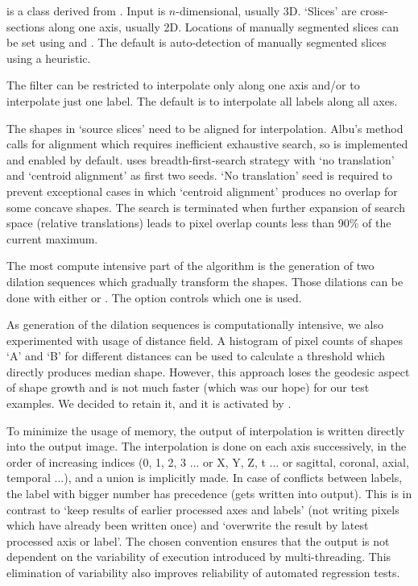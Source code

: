\documentclass{InsightArticle}
\begin{document}
 is a class derived from
.
Input is $n$-dimensional, usually 3D.
`Slices' are cross-sections along one axis, usually 2D.
Locations of manually segmented slices can be set using
 and .
The default is auto-detection of manually segmented slices using a heuristic.

The filter can be restricted to interpolate only along one axis
and/or to interpolate just one label.
The default is to interpolate all labels along all axes.

The shapes in `source slices' need to be aligned for interpolation.
Albu's method~\cite{Albu2008} calls for alignment
which requires inefficient exhaustive search,
so  is implemented and enabled by default.
 uses breadth-first-search strategy
with `no translation' and `centroid alignment' as first two seeds.
`No translation' seed is required to prevent exceptional cases in which
`centroid alignment' produces no overlap for some concave shapes.
The search is terminated when further expansion of search space
(relative translations) leads to pixel overlap counts
less than 90\% of the current maximum.

The most compute intensive part of the algorithm
is the generation of two dilation sequences which gradually transform the shapes.
Those dilations can be done with either 
or .
The option  controls which one is used.

As generation of the dilation sequences is computationally intensive,
we also experimented with usage of distance field.
A histogram of pixel counts of shapes `A' and `B' for different distances
can be used to calculate a threshold which directly produces median shape.
However, this approach loses the geodesic aspect of shape growth and
is not much faster (which was our hope) for our test examples.
We decided to retain it, and it is activated by .

To minimize the usage of memory, the output of interpolation is written
directly into the output image.
The interpolation is done on each axis successively,
in the order of increasing indices (0, 1, 2, 3 ... or X, Y, Z, t ...
or sagittal, coronal, axial, temporal ...), and a union is implicitly made.
In case of conflicts between labels,
the label with bigger number has precedence (gets written into output).
This is in contrast to `keep results of earlier processed axes and labels'
(not writing pixels which have already been written once)
and `overwrite the result by latest processed axis or label'.
The chosen convention ensures that the output is not dependent on the
variability of execution introduced by multi-threading.
This elimination of variability also improves
reliability of automated regression tests.
\end{document}
